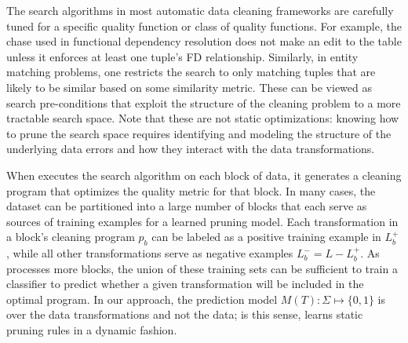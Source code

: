 The search algorithms in  most automatic data cleaning frameworks are carefully tuned for a specific quality function or class of quality functions. For example, the chase used in functional dependency resolution does not make an edit to the table unless it enforces at least one tuple's FD relationship.    Similarly, in entity matching problems, one restricts the search to only matching tuples that are likely to be similar based on some similarity metric.
These can be viewed as search pre-conditions that exploit the structure of the cleaning problem to a more tractable search space.
Note that these are not static optimizations: knowing how to prune the search space requires identifying and modeling the structure of the underlying data errors and how they interact with the data transformations.


When \sys executes the search algorithm on each block of data, it generates a cleaning program that optimizes the quality metric for that block.  In many cases, the dataset can be partitioned into a large number of blocks that each serve as sources of training examples for a learned pruning model.  Each transformation in a block's  cleaning program $p_b$ can be labeled as a positive training example in $L_b^+$, while all other transformations serve as negative examples $L_b^- = L - L_b^+$.
As \sys processes more blocks, the union of these training sets can be sufficient to train a classifier to predict whether a given transformation will be included in the optimal program.  In our approach, the prediction model $M(T): \Sigma \mapsto \{0,1\}$ is over the data transformations and not the data; is this sense, \sys learns static pruning rules in a dynamic fashion.    


